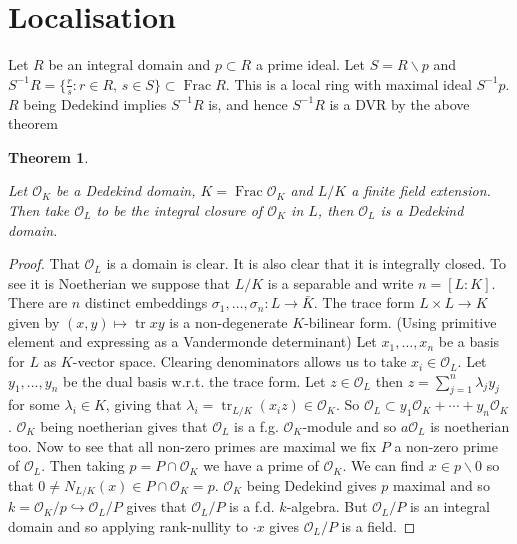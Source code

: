 \documentclass[10pt,]{book}
\theoremstyle{plain}
\newtheorem{theorem}{Theorem}[section]
\theoremstyle{definition}
\newcommand{\cO}{\mathcal{O}}
\DeclareMathOperator{\tr}{tr}
\DeclareMathOperator{\Frac}{Frac}
\begin{document}
\section[Localisation]{Localisation}\label{sec-localisation}
Let \(R\) be an integral domain and \(p \subset R\) a prime ideal.
          Let \(S = R\smallsetminus p\) and \(S^{-1}R = \{\frac{r}{s} : r\in R,\, s\in S\}\subset\Frac R\).
          This is a local ring with maximal ideal \(S^{-1}p\).
          \(R\) being Dedekind implies \(S^{-1}R\) is, and hence \(S^{-1}R\) is a DVR by the above theorem 
\begin{theorem}\label{theorem-5}

            Let \(\cO_K\) be a Dedekind domain, \(K = \Frac \cO_K\) and \(L/K\) a finite field extension.
            Then take \(\cO_L\) to be the integral closure of \(\cO_K\) in \(L\), then \(\cO_L\) is a Dedekind domain.
          \end{theorem}
\begin{proof}

            That \(\cO_L\) is a domain is clear.\newline{}
            It is also clear that it is integrally closed.\newline{}
            To see it is Noetherian we suppose that \(L/K\) is a separable and write \(n = [L:K]\).
            There are \(n\) distinct embeddings \(\sigma_1,\ldots,\sigma_n\colon L \to \bar K\).
            The trace form \(L\times L \to K\) given by \((x,y)\mapsto \tr xy\) is a non-degenerate \(K\)-bilinear form.
            (Using primitive element and expressing as a Vandermonde determinant)
            Let \(x_1,\ldots,x_n\) be a basis for \(L\) as  \(K\)-vector space.
            Clearing denominators allows us to take \(x_i \in \cO_L\).
            Let \(y_1,\ldots,y_n\) be the dual basis w.r.t. the trace form.
            Let \(z\in \cO_L\) then \(z = \sum_{j =1}^{n}\lambda_j y_j\) for some \(\lambda_i \in K\), giving that \(\lambda_i = \tr_{L/K}(x_i z)\in \cO_K\).
            So \(\cO_L \subset y_1\cO_K + \cdots + y_n \cO_K\).
            \(\cO_K\) being noetherian gives that \(\cO_L\) is a f.g. \(\cO_K\)-module and so \(a\cO_L\) is noetherian too.\newline{}
            Now to see that all non-zero primes are maximal we fix \(P\) a non-zero prime of \(\cO_L\).
            Then taking \(p = P \cap \cO_K\) we have a prime of \(\cO_K\).
            We can find \(x \in p \smallsetminus 0\) so that \(0 \ne N_{L/K} (x) \in P \cap \cO_K = p\).
            \(\cO_K\) being Dedekind gives \(p\) maximal and so \(k = \cO_K/p \hookrightarrow \cO_L/P\) gives that \(\cO_L/P\) is a f.d. \(k\)-algebra.
            But \(\cO_L/P\) is an integral domain and so applying rank-nullity to \(\cdot x\) gives \(\cO_L/P\) is a field.
          \end{proof}
\end{document}
